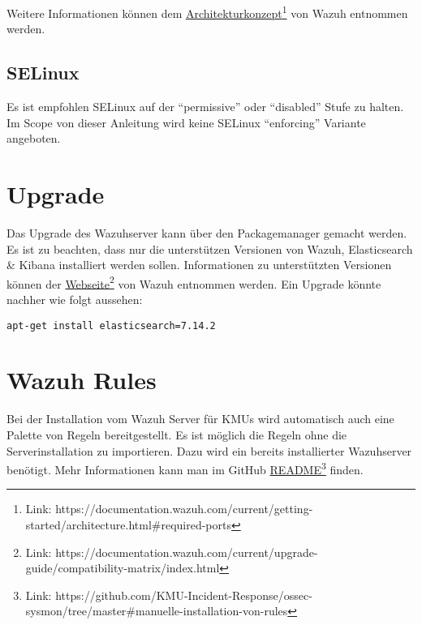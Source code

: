 Weitere Informationen können dem \href{https://documentation.wazuh.com/current/getting-started/architecture.html\#required-ports}{Architekturkonzept}\footnote{Link: https://documentation.wazuh.com/current/getting-started/architecture.html\#required-ports} von Wazuh entnommen werden.\\


\subsection{SELinux}
Es ist empfohlen SELinux auf der ``permissive'' oder ``disabled'' Stufe zu halten. Im Scope von dieser Anleitung wird keine SELinux ``enforcing'' Variante angeboten.

\section{Upgrade}
Das Upgrade des Wazuhserver kann über den Packagemanager gemacht werden.
Es ist zu beachten, dass nur die unterstützen Versionen von Wazuh, Elasticsearch \& Kibana installiert werden sollen.
Informationen zu unterstützten Versionen können der \href{https://documentation.wazuh.com/current/upgrade-guide/compatibility-matrix/index.html}{Webseite}\footnote{Link: https://documentation.wazuh.com/current/upgrade-guide/compatibility-matrix/index.html} von Wazuh entnommen werden. Ein Upgrade könnte nachher wie folgt aussehen:
\begin{lstlisting}
apt-get install elasticsearch=7.14.2
\end{lstlisting}


\section{Wazuh Rules}
Bei der Installation vom Wazuh Server für KMUs wird automatisch auch eine Palette von Regeln bereitgestellt.
Es ist möglich die Regeln ohne die Serverinstallation zu importieren.
Dazu wird ein bereits installierter Wazuhserver benötigt.
Mehr Informationen kann man im GitHub \href{https://github.com/KMU-Incident-Response/ossec-sysmon/tree/master\#manuelle-installation-von-rules}{README}\footnote{Link: https://github.com/KMU-Incident-Response/ossec-sysmon/tree/master\#manuelle-installation-von-rules} finden.